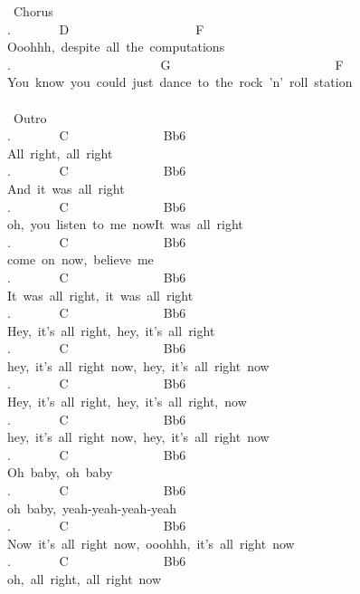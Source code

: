{\lbrack\ Chorus\rbrack\\
. \ \ \ \ \ \ \ D\ \ \ \ \ \ \ \ \ \ \ \ \ \ \ \ \ \ \ \ F\\
Ooohhh,\ despite\ all\ the\ computations\\
. \ \ \ \ \ \ \ \ \ \ \ \ \ \ \ \ \ \ \ \ \ \ \ G\ \ \ \ \ \ \ \ \ \ \ \ \ \ \ \ \ \ \ \ \ \ \ \ \ \ F\\
You\ know\ you\ could\ just\ dance\ to\ the\ rock\ 'n'\ roll\ station\\
\\
\lbrack\ Outro\rbrack\\
. \ \ \ \ \ \ \ C\ \ \ \ \ \ \ \ \ \ \ \ \ \ \ Bb6\ \ \ \ \ \\
All\ right,\ all\ right\\
. \ \ \ \ \ \ \ C\ \ \ \ \ \ \ \ \ \ \ \ \ \ \ Bb6\ \ \ \ \ \\
And\ it\ was\ all\ right\\
. \ \ \ \ \ \ \ C\ \ \ \ \ \ \ \ \ \ \ \ \ \ \ Bb6\ \ \ \ \ \\
oh,\ you\ listen\ to\ me\ nowIt\ was\ all\ right\\
. \ \ \ \ \ \ \ C\ \ \ \ \ \ \ \ \ \ \ \ \ \ \ Bb6\ \ \ \ \ \\
come\ on\ now,\ believe\ me\\
. \ \ \ \ \ \ \ C\ \ \ \ \ \ \ \ \ \ \ \ \ \ \ Bb6\ \ \ \ \ \\
It\ was\ all\ right,\ it\ was\ all\ right\\
. \ \ \ \ \ \ \ C\ \ \ \ \ \ \ \ \ \ \ \ \ \ \ Bb6\ \ \ \ \ \\
Hey,\ it's\ all\ right,\ hey,\ it's\ all\ right\\
. \ \ \ \ \ \ \ C\ \ \ \ \ \ \ \ \ \ \ \ \ \ \ Bb6\ \ \ \ \ \\
hey,\ it's\ all\ right\ now,\ hey,\ it's\ all\ right\ now\\
. \ \ \ \ \ \ \ C\ \ \ \ \ \ \ \ \ \ \ \ \ \ \ Bb6\ \ \ \ \ \\
Hey,\ it's\ all\ right,\ hey,\ it's\ all\ right,\ now\\
. \ \ \ \ \ \ \ C\ \ \ \ \ \ \ \ \ \ \ \ \ \ \ Bb6\ \ \ \ \ \\
hey,\ it's\ all\ right\ now,\ hey,\ it's\ all\ right\ now\\
. \ \ \ \ \ \ \ C\ \ \ \ \ \ \ \ \ \ \ \ \ \ \ Bb6\ \ \ \ \ \\
Oh\ baby,\ oh\ baby\\
. \ \ \ \ \ \ \ C\ \ \ \ \ \ \ \ \ \ \ \ \ \ \ Bb6\ \ \ \ \ \\
oh\ baby,\ yeah-yeah-yeah-yeah\\
. \ \ \ \ \ \ \ C\ \ \ \ \ \ \ \ \ \ \ \ \ \ \ Bb6\ \ \ \ \ \\
Now\ it's\ all\ right\ now,\ ooohhh,\ it's\ all\ right\ now\\
. \ \ \ \ \ \ \ C\ \ \ \ \ \ \ \ \ \ \ \ \ \ \ Bb6\ \ \ \ \ \\
oh,\ all\ right,\ all\ right\ now}

